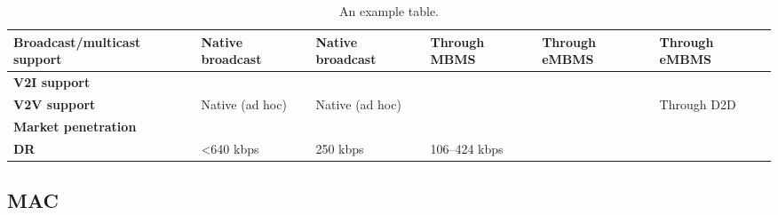\begin{table}[h!]
\begin{tabulary}{\textwidth}{L|L|L|L|L|L}
	\bf{Broadcast/multicast support} & Native broadcast                                      & Native broadcast                                      & Through MBMS                     & Through eMBMS            & Through eMBMS             \\\hline
	\bf{V2I support}                 & \ok                                                   & \ok                                                   & \ok                              & \ok                      & \ok                       \\\hline
	\bf{V2V support}                 & Native (ad hoc)                                       & Native (ad hoc)                                       & \ko                              & \ko                      & Through D2D               \\\hline
	\bf{Market penetration}          & \ok                                                   & \ko                                                   & \ok                              & \ok                      & \ok                       \\\hline
	\bf{\ac{DR}}                   & <640 kbps                                        & 250 kbps                                              & 106–424 kbps                              & \ok                      & \ok                       \\\hline
	\end{tabulary}
	\caption{\label{tab:Tableppp} An example table.}
\end{table}




\subsection{MAC}

